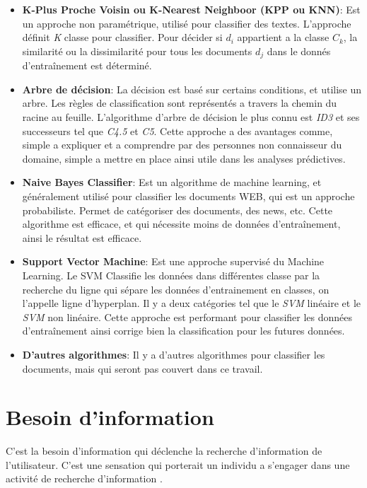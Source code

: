 \begin{itemize}
    \item \textbf{K-Plus Proche Voisin ou K-Nearest Neighboor (KPP ou KNN)}: Est un approche non paramétrique, utilisé pour classifier des textes. L'approche définit \textit{K} classe pour classifier. Pour décider si $d_{i}$ appartient a la classe $C_{k}$, la similarité ou la dissimilarité pour tous les documents $d_{j}$ dans le donnés d’entraînement est déterminé.
    \item \textbf{Arbre de décision}: La décision est basé sur certains conditions, et utilise un arbre. Les règles de classification sont représentés a travers la chemin du racine au feuille. L'algorithme d'arbre de décision le plus connu est \textit{ID3} et ses successeurs tel que \textit{C4.5} et \textit{C5}. Cette approche a des avantages comme, simple a expliquer et a comprendre par des personnes non connaisseur du domaine, simple a mettre en place ainsi utile dans les analyses prédictives.
    \item \textbf{Naive Bayes Classifier}: Est un algorithme de machine learning, et généralement utilisé pour classifier les documents WEB, qui est un approche probabiliste. Permet de catégoriser des documents, des news, etc. Cette algorithme est efficace, et qui nécessite moins de données d’entraînement, ainsi le résultat est efficace.
    \item \textbf{Support Vector Machine}: Est une approche supervisé du Machine Learning. Le SVM Classifie les données dans différentes classe par la recherche du ligne qui sépare les données d'entrainement en classes, on l'appelle ligne d'hyperplan. Il y a deux catégories tel que le \textit{SVM} linéaire et le \textit{SVM} non linéaire. Cette approche est performant pour classifier les données d’entraînement ainsi corrige bien la classification pour les futures données.
    \item \textbf{D'autres algorithmes}: Il y a d'autres algorithmes pour classifier les documents, mais qui seront pas couvert dans ce travail.
\end{itemize}

\section{Besoin d'information}\label{sec:besoin-information}
\begin{definition}
    C'est la besoin d'information qui déclenche la recherche d'information de l'utilisateur. C'est une sensation qui porterait un individu a s'engager dans une activité de recherche d'information \citep{thesaurus-ir-web}.
\end{definition}

